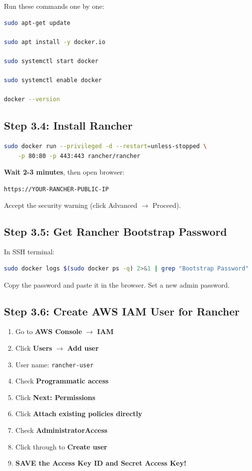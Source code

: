 \documentclass[12pt,a4paper]{article}
\begin{document}
Run these commands one by one:

\begin{lstlisting}[language=bash]
sudo apt-get update

sudo apt install -y docker.io

sudo systemctl start docker

sudo systemctl enable docker

docker --version
\end{lstlisting}

\subsection{Step 3.4: Install Rancher}

\begin{lstlisting}[language=bash]
sudo docker run --privileged -d --restart=unless-stopped \
    -p 80:80 -p 443:443 rancher/rancher
\end{lstlisting}

\textbf{Wait 2-3 minutes}, then open browser:

\begin{center}
\texttt{https://YOUR-RANCHER-PUBLIC-IP}
\end{center}

Accept the security warning (click Advanced $\rightarrow$ Proceed).

\subsection{Step 3.5: Get Rancher Bootstrap Password}

In SSH terminal:

\begin{lstlisting}[language=bash]
sudo docker logs $(sudo docker ps -q) 2>&1 | grep "Bootstrap Password"
\end{lstlisting}

Copy the password and paste it in the browser. Set a new admin password.

\subsection{Step 3.6: Create AWS IAM User for Rancher}

\begin{enumerate}
    \item Go to \textbf{AWS Console} $\rightarrow$ \textbf{IAM}
    \item Click \textbf{Users} $\rightarrow$ \textbf{Add user}
    \item User name: \texttt{rancher-user}
    \item Check \textbf{Programmatic access}
    \item Click \textbf{Next: Permissions}
    \item Click \textbf{Attach existing policies directly}
    \item Check \textbf{AdministratorAccess}
    \item Click through to \textbf{Create user}
    \item \textbf{SAVE the Access Key ID and Secret Access Key!}
\end{enumerate}
\end{document}
